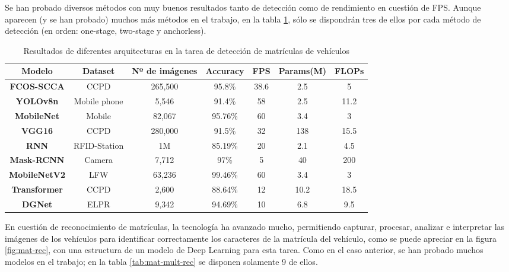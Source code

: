 \documentclass[11pt]{article}
\begin{document}
Se han probado diversos métodos con muy buenos resultados tanto de detección como de rendimiento en cuestión de FPS. Aunque aparecen (y se han probado) muchos más métodos en el trabajo, en la tabla \ref{tab:mat-mult-det}, sólo se dispondrán tres de ellos por cada método de detección (en orden: one-stage, two-stage y anchorless).

\begin{table}[htb]
    \centering
    \begin{tabular}{|c|c|c|c|c|c|c|}
         \hline   
         \textbf{Modelo} & \textbf{Dataset} & \textbf{Nº de imágenes} & \textbf{Accuracy} & \textbf{FPS} & \textbf{Params(M)} & \textbf{FLOPs}\\
         \hline
         \textbf{FCOS-SCCA} & CCPD & 265,500 & 95.8\% & 38.6 & 2.5 & 5\\ 
         \hline
         \textbf{YOLOv8n} & Mobile phone & 5,546 & 91.4\% & 58 & 2.5 & 11.2\\ 
         \hline
         \textbf{MobileNet} & Mobile & 	82,067 & 95.76\% & 60 & 3.4 & 3\\ 
         \hline
         \textbf{VGG16} & CCPD & 280,000 & 91.5\% & 32 & 138 & 15.5\\ 
         \hline
         \textbf{RNN} & RFID-Station & 1M & 85.19\% & 20 & 2.1 & 4.5\\ 
         \hline
         \textbf{Mask-RCNN} & Camera & 7,712 & 97\% & 5 & 40 & 200\\ 
         \hline
         \textbf{MobileNetV2} & LFW & 63,236 & 99.46\% & 60 & 3.4 & 3\\ 
         \hline
         \textbf{Transformer} & CCPD & 2,600 & 88.64\% & 12 & 10.2 & 18.5\\ 
         \hline
         \textbf{DGNet} & ELPR & 9,342 & 94.69\% & 10 & 6.8 & 9.5\\ 
         \hline
    \end{tabular}
    \caption{Resultados de diferentes arquitecturas en la tarea de detección de matrículas de vehículos}
    \label{tab:mat-mult-det}
\end{table}

En cuestión de reconocimiento de matrículas, la tecnología ha avanzado mucho, permitiendo capturar, procesar, analizar e interpretar las imágenes de los vehículos para identificar correctamente los caracteres de la matrícula del vehículo, como se puede apreciar en la figura \ref{fig:mat-rec}, con una estructura de un modelo de Deep Learning para esta tarea. Como en el caso anterior, se han probado muchos modelos en el trabajo; en la tabla \ref{tab:mat-mult-rec} se disponen solamente 9 de ellos. 
\end{document}
